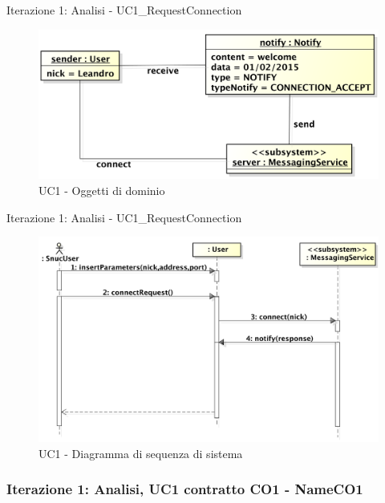 \documentclass[t]{beamer} %
\begin{document}
\begin{frame} {Iterazione 1: Analisi - UC1\_RequestConnection}
   \begin{figure}
     \includegraphics[scale=0.50]{image_astah/Iteration_1_DomainModel/UC1_RequestConnection_OM}{\centering}
     \caption{UC1 - Oggetti di dominio}
     \label{fig_UC1_RC_OM} 
   \end{figure}
\end{frame}

\begin{frame} {Iterazione 1: Analisi - UC1\_RequestConnection}
   \begin{figure}
     \includegraphics[scale=0.33]{image_astah/Iteration_1_DomainModel/UC1_RequestConnection_SSD.png}{\centering}
     \caption{UC1 - Diagramma di sequenza di sistema}
     \label{fig_UC1_RC_SSD} 
   \end{figure}
\end{frame}

\begin{frame}
 \frametitle{Iterazione 1: Analisi, UC1 contratto CO1 - NameCO1}
  \begin{table}[!htbp]
   \caption {UC1 Contratto CO1 - NameCO1}
    \label{table:1}
   \end{table}
\end{frame}
\end{document}

